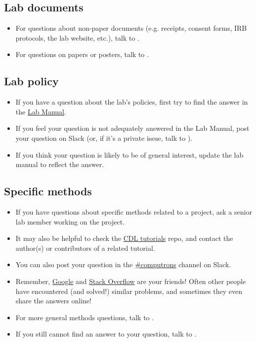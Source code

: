 \documentclass{tufte-book} %
\begin{document}
\subsection{Lab documents}
\begin{itemize}
\item For questions about non-paper documents (e.g. receipts, consent forms, IRB protocols, the lab website, etc.), talk to \coordinator.

\item For questions on papers or posters, talk to \director.
\end{itemize}

\subsection{Lab policy}
\begin{itemize}
\item If you have a question about the lab's policies, first try to
  find the answer in the
  \href{https://github.com/ContextLab/lab-manual/tree/master/lab_manual.pdf}{Lab
    Manual}.

\item If you feel your question is not adequately answered in the Lab
  Manual, post your question on Slack (or, if it's a private issue,
  talk to \director).

\item If you think your question is likely to be of general interest,
  update the lab manual to reflect the answer.
\end{itemize}

\subsection{Specific methods}
\begin{itemize}
\item If you have questions about specific methods related to a
  project, ask a senior lab member working on the project.

\item It may also be helpful to check the
  \href{https://github.com/contextLab/cdl-tutorials}{CDL tutorials}
  repo, and contact the author(s) or contributors of a related
  tutorial.

\item You can also post your question in the
  \href{https://context-lab.slack.com/messages/computrons/}{\#computrons}
  channel on Slack.

\item Remember, \href{https://www.google.com/}{Google} and
  \href{https://stackoverflow.com/}{Stack Overflow} are your friends!
  Often other people have encountered (and solved!) similar problems,
  and sometimes they even share the answers online!

\item For more general methods questions, talk to \coordinator.

\item If you still cannot find an answer to your question, talk to \director.
\end{itemize}
\end{document}
